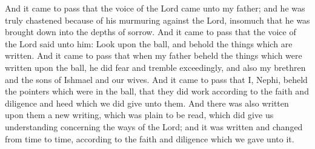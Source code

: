 And it came to pass that the voice of the Lord came unto my father; and he was truly chastened because of his murmuring against the Lord, insomuch that he was brought down into the depths of sorrow.
\bverse \iffalse And it came to pass that the voice of the Lord said unto him: Look upon the ball, and behold the things which are written. \fi
And it came to pass that the voice of the Lord said unto him: Look upon the ball, and behold the things which are written.
\bverse \iffalse And it came to pass that when my father beheld the things which were written upon the ball, he did fear and tremble exceedingly, and also my brethren and the sons of Ishmael and our wives. \fi
And it came to pass that when my father beheld the things which were written upon the ball, he did fear and tremble exceedingly, and also my brethren and the sons of Ishmael and our wives.
\bverse \iffalse And it came to pass that I, Nephi, beheld the pointers which were in the ball, that they did work according to the faith and diligence and heed which we did give unto them. \fi
And it came to pass that I, Nephi, beheld the pointers which were in the ball, that they did work according to the faith and diligence and heed which we did give unto them.
\bverse \iffalse And there was also written upon them a new writing, which was plain to be read, which did give us understanding concerning the ways of the Lord; and it was written and changed from time to time, according to the faith and diligence which we gave unto it. \fi
And there was also written upon them a new writing, which was plain to be read, which did give us understanding concerning the ways of the Lord; and it was written and changed from time to time, according to the faith and diligence which we gave unto it.

